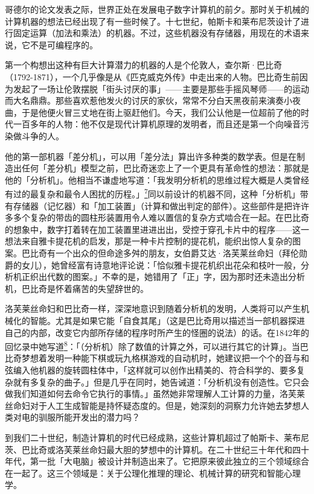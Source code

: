\documentclass[
  12pt,
  twoside,
  openright,
  oldfontcommands,
]{memoir}
\begin{document}
哥德尔的论文发表之际，世界正处在发展电子数字计算机的前夕。那时关于机械的计算机器的想法已经出现了有一些时候了。十七世纪，帕斯卡和莱布尼茨设计了进行固定运算（加法和乘法）的机器。不过，这些机器没有存储器，用现在的术语来说，它不是可编程序的。

第一个构想出这种有巨大计算潜力的机器的人是个伦敦人，查尔斯·巴比奇（1792-1871），一个几乎像是从《匹克威克外传》中走出来的人物。巴比奇生前因为发起了一场让伦敦摆脱「街头讨厌的事」------主要是那些手摇风琴师------的运动而大名鼎鼎。那些喜欢惹他发火的讨厌的家伙，常常不分白天黑夜前来演奏小夜曲，于是他便火冒三丈地在街上驱赶他们。今天，我们公认他是一位超前了他的时代一百多年的人物：他不仅是现代计算机原理的发明者，而且还是第一个向噪音污染做斗争的人。

他的第一部机器「差分机」，可以用「差分法」算出许多种类的数学表。但是在制造出任何「差分机」模型之前，巴比奇迷恋上了一个更具有革命性的想法：那就是他的「分析机」。他相当不谦虚地写道：{「我发明分析机的思维过程大概是人类曾经有过的最复杂和最令人困扰的历程。」\hyperref[fn:Introduction-7]{\textsuperscript{7}}}同以前设计的机器不同，这种「分析机」带有存储器（记忆器）和「加工装置」（计算和做出判定的部件）。这些部件是把许许多多个复杂的带齿的圆柱形装置用令人难以置信的复杂方式啮合在一起。在巴比奇的想象中，数字打着转在加工装置里进进出出，受控于穿孔卡片中的程序------这一想法来自雅卡提花机的启发，那是一种卡片控制的提花机，能织出惊人复杂的图案。巴比奇有一个出众的但命途多舛的朋友，女伯爵艾达·洛芙莱丝命妇（拜伦勋爵的女儿），她曾经富有诗意地评论说：{「恰似雅卡提花机织出花朵和枝叶一般，分析机正织出代数的图案。」}不幸的是，她错用了「正」字，因为那时还未造出分析机，巴比奇是怀着痛苦的失望辞世的。

洛芙莱丝命妇和巴比奇一样，深深地意识到随着分析机的发明，人类将可以产生机械化的智能。尤其是如果它能「自食其尾」（这是巴比奇用以描述当一部机器探进自己的内部，改变它内部所存储的程序时所产生的怪圈的说法）的话。在1842年的回忆录中她写道\hyperref[fn:Introduction-8]{\textsuperscript{8}}：{「（分析机）除了数值的计算之外，可以进行其它的计算」}。当巴比奇梦想着发明一种能下棋或玩九格棋游戏的自动机时，她建议把一个个的音与和弦编入他机器的旋转圆柱体中，{「这样就可以创作出精美的、符合科学的、要多复杂就有多复杂的曲子。」}但是几乎在同时，她告诫道：{「分析机没有创造性。它只会做我们知道如何去命令它执行的事情。」}虽然她非常理解人工计算的力量，洛芙莱丝命妇对于人工生成智能是持怀疑态度的。但是，她深刻的洞察力允许她去梦想人类对电的驯服所能开发出的潜力吗？

到我们二十世纪，制造计算机的时代已经成熟，这些计算机超过了帕斯卡、莱布尼茨、巴比奇或洛芙莱丝命妇最大胆的梦想中的计算机。在二十世纪三十年代和四十年代，第一批「大电脑」被设计并制造出来了。它把原来彼此独立的三个领域综合在一起了。这三个领域是：关于公理化推理的理论、机械计算的研究和智能心理学。
\end{document}
